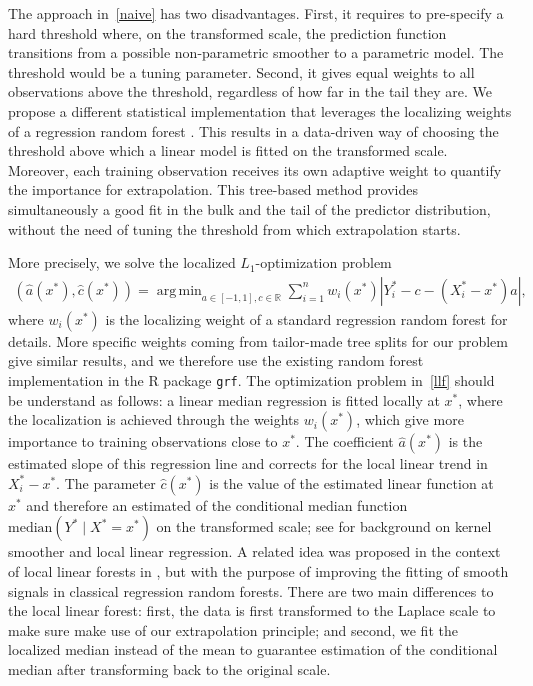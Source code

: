 \documentclass{statsoc}
\theoremstyle{break}
\DeclareMathOperator{\argmin}{arg\,min}
\def\M{\text{median}}
\begin{document}
The approach in~\eqref{naive} has two disadvantages. First, it requires to pre-specify a hard threshold where, on the transformed scale, the prediction function transitions from a possible non-parametric smoother 
 to a parametric model. The threshold would be a tuning parameter.
Second, it gives equal weights to all observations above the threshold, regardless of how far in the tail they are.
We propose a different statistical implementation that leverages the localizing weights of a regression random forest \citep{breiman:2001,meinshausen:2006, athey:tibshirani:wager:2019}. This results in a data-driven way of choosing the threshold above which a linear model is fitted on the transformed scale. Moreover, each training observation receives its own adaptive weight to quantify the importance for extrapolation. This tree-based method provides simultaneously a good fit in the bulk and the tail of the predictor distribution, without the need of tuning the threshold from which extrapolation starts.

More precisely, we solve the localized $L_1$-optimization problem 
\begin{align}
	\label{llf}
	(\widehat a(x^*), \widehat c(x^*)) = \argmin_{a\in[-1,1],c \in\mathbb R} \sum_{i=1}^n w_i(x^*) \left| Y_i^* - c  - (X_i^* - x^*) a \right|,
\end{align}
where $w_i(x^*)$ is the localizing weight of a standard regression random forest \citep[see, e.g.,][]{meinshausen:2006} for details. More specific weights coming from tailor-made tree splits for our problem give similar results, and we therefore use the existing random forest implementation in the R package \texttt{grf}.  
The optimization problem in~\eqref{llf} should be understand as follows: a linear median regression is fitted locally at $x^*$, where the localization is achieved through the weights $w_i(x^*)$, which give more importance to training observations close to $x^*$. The coefficient $\widehat a(x^*)$ is the estimated slope of this regression line and corrects for the local linear trend in $X^*_i - x^*$. The parameter $\widehat c(x^*)$ is the value of the estimated linear function at $x^*$ and therefore an estimated of the conditional median function $\M(Y^*\mid X^* = x^*)$ on the transformed scale; see \citet[][Section 6.1]{has2009} for background on kernel smoother and local linear regression. 
A related idea was proposed in the context of local linear forests in \cite{friedberg:tibshirani:wager:2021},
but with the purpose of improving the fitting of smooth signals in classical regression random forests. There are two main differences to the local linear forest: first, the data is first transformed to the Laplace scale to make sure make use of our extrapolation principle; and second, we fit the localized median instead of the mean to guarantee estimation of the conditional median after transforming back to the original scale.
\end{document}
